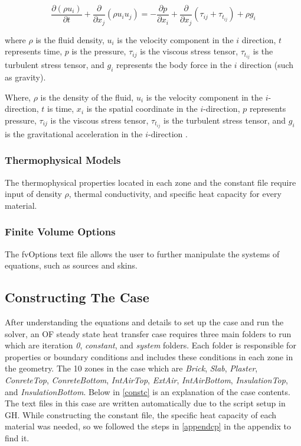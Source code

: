 \begin{equation}
\frac{\partial (\rho u_i)}{\partial t} + \frac{\partial}{\partial x_j} \left( \rho u_i u_j \right) = -\frac{\partial p}{\partial x_i} + \frac{\partial}{\partial x_j} \left( \tau_{ij} + \tau_{t_{ij}} \right) + \rho g_i
\end{equation}

where \(\rho\) is the fluid density, \(u_i\) is the velocity component in the \(i\) direction, \(t\) represents time, \(p\) is the pressure, \(\tau_{ij}\) is the viscous stress tensor, \(\tau_{t_{ij}}\) is the turbulent stress tensor, and \(g_i\) represents the body force in the \(i\) direction (such as gravity).


Where, $\rho$ is the density of the fluid, $u_i$ is the velocity component in the $i$-direction, $t$ is time, $x_i$ is the spatial coordinate in the $i$-direction, $p$ represents pressure, $\tau_{ij}$ is the viscous stress tensor, $\tau_{t_{ij}}$ is the turbulent stress tensor, and $g_i$ is the gravitational acceleration in the $i$-direction
 \cite{cht}.


\subsubsection{Thermophysical Models}
The thermophysical properties located in each zone and the constant file require input of density $\rho$, thermal conductivity, and specific heat capacity for every material.
\subsubsection{Finite Volume Options}
The fvOptions text file allows the user to further manipulate the systems of equations, such as sources and skins. 


\subsection{Constructing The Case}    
After understanding the equations and details to set up the case and run the solver, an \gls{OF} steady state heat transfer case requires three main folders to run which are iteration \textit{0}, \textit{constant}, and \textit{system} folders. Each folder is responsible for properties or boundary conditions and includes these conditions in each zone in the geometry. The 10 zones in the case which are \textit{Brick}, \textit{Slab}, \textit{Plaster}, \textit{ConreteTop}, \textit{ConreteBottom}, \textit{IntAirTop}, \textit{ExtAir}, \textit{IntAirBottom}, \textit{InsulationTop}, and \textit{InsulationBottom}. Below in \cref{constc} is an explanation of the case contents. The text files in this case are written automatically due to the script setup in \gls{GH}. While constructing the constant file, the specific heat capacity of each material was needed, so we followed the steps in \ref{appendcp} in the appendix to find it.






